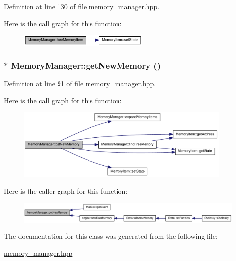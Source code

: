 Definition at line 130 of file memory\_\-manager.hpp.

Here is the call graph for this function:\nopagebreak
\begin{figure}[H]
\begin{center}
\leavevmode
\includegraphics[width=181pt]{class_memory_manager_a68915a0f823d79218e1db6746cd8199e_cgraph}
\end{center}
\end{figure}
\hypertarget{class_memory_manager_acafc29252617db5b035895aadb2946d4}{
\subsubsection[{getNewMemory}]{$\ast$ MemoryManager::getNewMemory ()}}
\label{class_memory_manager_acafc29252617db5b035895aadb2946d4}


Definition at line 91 of file memory\_\-manager.hpp.

Here is the call graph for this function:\nopagebreak
\begin{figure}[H]
\begin{center}
\leavevmode
\includegraphics[width=298pt]{class_memory_manager_acafc29252617db5b035895aadb2946d4_cgraph}
\end{center}
\end{figure}


Here is the caller graph for this function:\nopagebreak
\begin{figure}[H]
\begin{center}
\leavevmode
\includegraphics[width=398pt]{class_memory_manager_acafc29252617db5b035895aadb2946d4_icgraph}
\end{center}
\end{figure}


The documentation for this class was generated from the following file:\begin{DoxyCompactItemize}
\item 
\hyperlink{memory__manager_8hpp}{memory\_\-manager.hpp}\end{DoxyCompactItemize}
